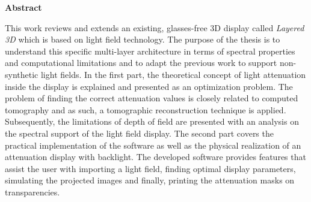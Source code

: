 \thispagestyle{empty}
\vspace{8cm}
\noindent
{\centerline {\bf \large Abstract}}
\vspace{1cm}
\noindent

This work reviews and extends an existing, glasses-free 3D display called \emph{Layered 3D} which is based on light field technology.
The purpose of the thesis is to understand this specific multi-layer architecture in terms of spectral properties and computational limitations and to adapt the previous work to support non-synthetic light fields.
In the first part, the theoretical concept of light attenuation inside the display is explained and presented as an optimization problem.
The problem of finding the correct attenuation values is closely related to computed tomography and as such, a tomographic reconstruction technique is applied.
Subsequently, the limitations of depth of field are presented with an analysis on the spectral support of the light field display.
The second part covers the practical implementation of the software as well as the physical realization of an attenuation display with backlight.
The developed software provides features that assist the user with importing a light field, finding optimal display parameters, simulating the projected images and finally, printing the attenuation masks on transparencies.